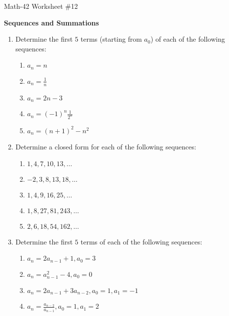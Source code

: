 \documentclass[letterpaper,12pt,fleqn]{article}
\begin{document}
\begin{center}
  \large Math-42 Worksheet \#12

  \textbf{Sequences and Summations}
\end{center}

\vspace{0.5in}

\begin{enumerate}[left=0in,itemsep=0.5in]
\item Determine the first \(5\) terms (starting from \(a_0\)) of each of the following sequences:
  \begin{enumerate}
  \item \(a_n=n\)
  \item \(a_n=\frac{1}{n}\)
  \item \(a_n=2n-3\)
  \item \(a_n=(-1)^n\frac{1}{2^n}\)
  \item \(a_n=(n+1)^2-n^2\)
  \end{enumerate}

\item Determine a closed form for each of the following sequences:
  \begin{enumerate}
  \item \(1,4,7,10,13,\ldots\)
  \item \(-2,3,8,13,18,\ldots\)
  \item \(1,4,9,16,25,\ldots\)
  \item \(1,8,27,81,243,\ldots\)
  \item \(2,6,18,54,162,\ldots\)
  \end{enumerate}

\item Determine the first \(5\) terms of each of the following sequences:
  \begin{enumerate}
  \item \(a_n=2a_{n-1}+1, a_0=3\)
  \item \(a_n=a_{n-1}^2-4, a_0=0\)
  \item \(a_n=2a_{n-1}+3a_{n-2}, a_0=1, a_1=-1\)
  \item \(a_n=\frac{a_{n-2}}{a_{n-1}}, a_0=1, a_1=2\)
  \end{enumerate}


\end{enumerate}
\end{document}
